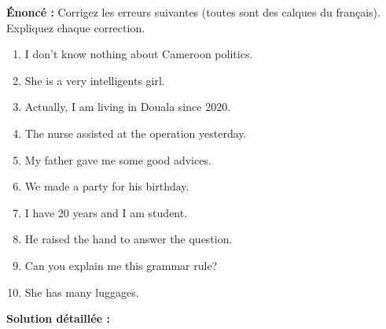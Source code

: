\documentclass[11pt]{article}
\begin{document}
\begin{exoresolu}
\textbf{Énoncé :} Corrigez les erreurs suivantes (toutes sont des calques du français). Expliquez chaque correction.

\begin{enumerate}
    \item I don't know nothing about Cameroon politics.
    \item She is a very intelligents girl.
    \item Actually, I am living in Douala since 2020.
    \item The nurse assisted at the operation yesterday.
    \item My father gave me some good advices.
    \item We made a party for his birthday.
    \item I have 20 years and I am student.
    \item He raised the hand to answer the question.
    \item Can you explain me this grammar rule?
    \item She has many luggages.
\end{enumerate}

\tcblower

\textbf{Solution détaillée :}


\end{exoresolu}
\end{document}
